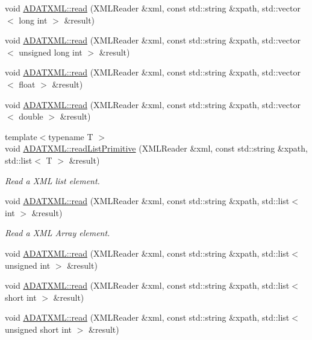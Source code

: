 \begin{DoxyCompactItemize}
\item 
void \mbox{\hyperlink{group__io_gaad4f8586d1c41ae7f0c32a40754623f5}{A\+D\+A\+T\+X\+M\+L\+::read}} (X\+M\+L\+Reader \&xml, const std\+::string \&xpath, std\+::vector$<$ long int $>$ \&result)
\item 
void \mbox{\hyperlink{group__io_ga04a1d8c6fa265cdf5824019b4f94844f}{A\+D\+A\+T\+X\+M\+L\+::read}} (X\+M\+L\+Reader \&xml, const std\+::string \&xpath, std\+::vector$<$ unsigned long int $>$ \&result)
\item 
void \mbox{\hyperlink{group__io_ga161a35ac40c7f85342a454fbc17e2dad}{A\+D\+A\+T\+X\+M\+L\+::read}} (X\+M\+L\+Reader \&xml, const std\+::string \&xpath, std\+::vector$<$ float $>$ \&result)
\item 
void \mbox{\hyperlink{group__io_ga49fa13abbc0b2a2273c58d328d1e7d70}{A\+D\+A\+T\+X\+M\+L\+::read}} (X\+M\+L\+Reader \&xml, const std\+::string \&xpath, std\+::vector$<$ double $>$ \&result)
\item 
{\footnotesize template$<$typename T $>$ }\\void \mbox{\hyperlink{namespaceADATXML_ad39ebe1fb986ec4121572e877b5dacb8}{A\+D\+A\+T\+X\+M\+L\+::read\+List\+Primitive}} (X\+M\+L\+Reader \&xml, const std\+::string \&xpath, std\+::list$<$ T $>$ \&result)
\begin{DoxyCompactList}\small\item\em Read a X\+ML list element. \end{DoxyCompactList}\item 
void \mbox{\hyperlink{group__io_gab7d805fe66e6e3f1f897d4dabd3b29ad}{A\+D\+A\+T\+X\+M\+L\+::read}} (X\+M\+L\+Reader \&xml, const std\+::string \&xpath, std\+::list$<$ int $>$ \&result)
\begin{DoxyCompactList}\small\item\em Read a X\+ML Array element. \end{DoxyCompactList}\item 
void \mbox{\hyperlink{group__io_gab76dffc06569f27474fb03e08b372393}{A\+D\+A\+T\+X\+M\+L\+::read}} (X\+M\+L\+Reader \&xml, const std\+::string \&xpath, std\+::list$<$ unsigned int $>$ \&result)
\item 
void \mbox{\hyperlink{group__io_gaf316ff420b43fcc4c23590001af57c66}{A\+D\+A\+T\+X\+M\+L\+::read}} (X\+M\+L\+Reader \&xml, const std\+::string \&xpath, std\+::list$<$ short int $>$ \&result)
\item 
void \mbox{\hyperlink{group__io_ga6a4f6e0bca990676d09efaf318ed8eb7}{A\+D\+A\+T\+X\+M\+L\+::read}} (X\+M\+L\+Reader \&xml, const std\+::string \&xpath, std\+::list$<$ unsigned short int $>$ \&result)

\end{DoxyCompactItemize}
